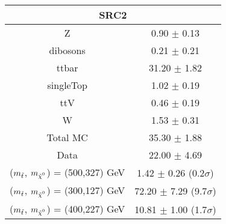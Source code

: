\begin{tabular}{c|c}
\hline\hline
\multicolumn{2}{c}{\bf SRC2 } \\ \hline 
Z & 0.90 $\pm$ 0.13 \\
dibosons & 0.21 $\pm$ 0.21 \\
ttbar & 31.20 $\pm$ 1.82 \\
singleTop & 1.02 $\pm$ 0.19 \\
ttV & 0.46 $\pm$ 0.19 \\
W & 1.53 $\pm$ 0.31 \\
\hline
Total MC & 35.30 $\pm$ 1.88 \\
Data & 22.00 $\pm$ 4.69 \\
\hline
 ($m_{\tilde{t}}$, $\mLSP$) = (500,327) GeV & 1.42 $\pm$ 0.26 (0.2$\sigma$) \\
\hline
 ($m_{\tilde{t}}$, $\mLSP$) = (300,127) GeV & 72.20 $\pm$ 7.29 (9.7$\sigma$) \\
\hline
 ($m_{\tilde{t}}$, $\mLSP$) = (400,227) GeV & 10.81 $\pm$ 1.00 (1.7$\sigma$) \\
\hline\hline
\end{tabular}

